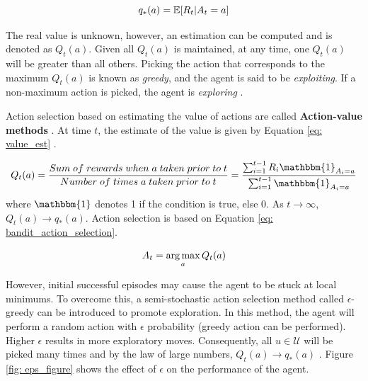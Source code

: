 \begin{equation}
    \centering
    q_*(a) = \mathbb{E}[R_t | A_t = a]
    \label{eq: value}
\end{equation}

The real value is unknown, however, an estimation can be computed and is denoted as $Q_t(a)$.  Given all $Q_t(a)$ is maintained, at any time, one $Q_t(a)$ will be greater than all others.  Picking the action that corresponds to the maximum $Q_t(a)$ is known as \textit{greedy}, and the agent is said to be \textit{exploiting}.  If a non-maximum action is picked, the agent is \textit{exploring} \cite{sutton}.

Action selection based on estimating the value of actions are called \textbf{Action-value methods} \cite{action_value_method}.  At time $t$, the estimate of the value is given by Equation \ref{eq: value_est} \cite{sutton}.

\begin{equation}
    \centering
    Q_t(a) = \frac{Sum \; of \; rewards \; when \; a \; taken \; prior \; to \; t}
    {Number \; of \; times \; a \; taken \; prior \; to \; t} 
    = \frac{\sum_{i=1}^{t - 1} R_i \mathbbm{1}_{A_i=a}}
    {\sum_{i = 1}^{t - 1} \mathbbm{1}_{A_i = a}}
    \label{eq: value_est}
\end{equation}
where $\mathbbm{1}$ denotes 1 if the condition is true, else 0.  As $t \rightarrow \infty$, $Q_t(a) \rightarrow q_*(a)$.  Action selection is based on Equation \ref{eq: bandit_action_selection}.

\begin{equation}
    \centering
    A_t = \argmax_a Q_t(a)
    \label{eq: bandit_action_selection}
\end{equation}

However, initial successful episodes may cause the agent to be stuck at local minimums. To overcome this, a semi-stochastic action selection method called $\epsilon$-greedy can be introduced to promote exploration. In this method, the agent will perform a random action with $\epsilon$ probability (greedy action can be performed).  Higher $\epsilon$ results in more exploratory moves.  Consequently, all $u \in \mathcal{U}$ will be picked many times and by the law of large numbers, $Q_t(a) \rightarrow q_*(a)$ \cite{large_numbers}. Figure \ref{fig: eps_figure} shows the effect of $\epsilon$ on the performance of the agent.

